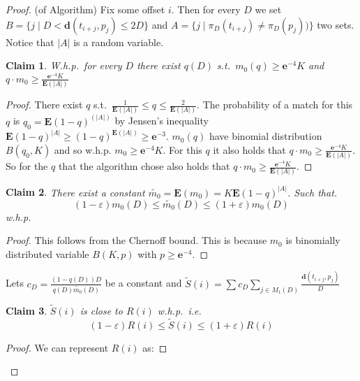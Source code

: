 \documentclass[11pt]{article}
\newtheorem{claim}{Claim}[section]
\newcommand{\envert}[1]{\left\lvert#1\right\rvert}
\let\abs=\envert
\newcommand{\bfE}{\textbf{E}}
\newcommand{\bfe}{\textbf{e}}
\newcommand{\dist}{\textbf{d}}
\begin{document}
\begin{proof}(of Algorithm)
Fix some offset $i$. Then for every $D$ we set $B=\{j\mid
D<\dist(t_{i+j},p_j)\leq 2D \}$ and $A=\{j\mid \pi_D(t_{i+j})\neq
\pi_D(p_j)) \}$ two sets. Notice that $\abs{A}$ is a random variable.
\begin{claim}\label{1claim}
W.h.p.\ for every $D$ there exist $q(D)$ s.t.\ $m_0(q)\geq
\bfe^{-4}K$ and $q\cdot m_0 \geq \frac{\bfe^{-4}K}{\bfE(\abs{A})}$
\end{claim}
\begin{proof}
There exist $q$ s.t.\ $\frac{1}{\bfE(\abs{A})}\leq q \leq
\frac{2}{\bfE(\abs{A})}$. The probability of a match for this $q$ is
$q_0=\bfE(1-q)^{(\abs{A})}$ by Jensen's inequality
$\bfE(1-q)^{\abs{A}}\geq (1-q)^{\bfE(\abs{A})}\geq \bfe^{-3}$.
$m_0(q)$  have binomial distribution $B(q_0,K)$ and so w.h.p.
$m_0\geq \bfe^{-4}K$. For this $q$  it also holds that $q\cdot m_0
\geq \frac{\bfe^{-4}K}{\bfE(\abs{A})}$. So for the $q$ that the algorithm
chose also holds that $q\cdot m_0 \geq
\frac{\bfe^{-4}K}{\bfE(\abs{A})}$.
\end{proof}
\begin{claim}
There exist a constant $\tilde{m_0}=\bfE(m_0) =K\bfE(1-q)^{\abs{A}}$. Such
that.
\[(1-\varepsilon)m_0(D)\leq
\tilde{m_0}(D)\leq(1+\varepsilon)m_0(D)\] w.h.p.
\end{claim}
\begin{proof}
This follows from the Chernoff bound. This is because $m_0$ is binomially
distributed variable $B(K,p)$ with $p\geq \bfe^{-4}$.
\end{proof}
Lets $c_D=\frac{(1-q(D))D}{q(D)\tilde{m_0}(D)}$ be a constant and $\displaystyle \tilde{S}(i)=\sum c_D\sum_{j\in M_1(D)}
\frac{\dist(t_{i+j},p_j)}{D}$
\begin{claim}
$\tilde{S}(i)$ is close to $R(i)$ w.h.p.\ i.e.
\[
(1-\varepsilon)R(i)\leq \tilde{S}(i)\leq(1+\varepsilon)R(i)
\]
\end{claim}
\begin{proof}
We can represent $R(i)$ as:


\end{proof}
\end{proof}
\end{document}
